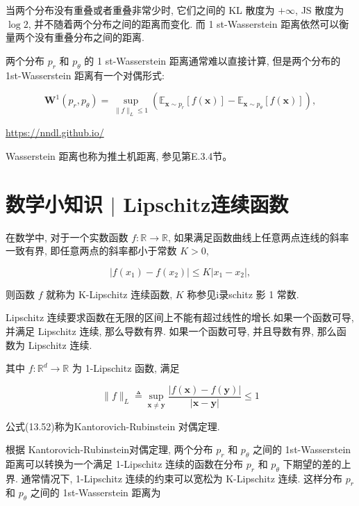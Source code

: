 \documentclass[10pt]{article}
\begin{document}
当两个分布没有重叠或者重叠非常少时, 它们之间的 KL 散度为 $+\infty$, JS 散度为 $\log 2$, 并不随着两个分布之间的距离而变化. 而 1 st-Wasserstein 距离依然可以衡量两个没有重叠分布之间的距离.

两个分布 $p_{r}$ 和 $p_{\theta}$ 的 1 st-Wasserstein 距离通常难以直接计算, 但是两个分布的 1st-Wasserstein 距离有一个对偶形式:


\begin{equation*}
\boldsymbol{W}^{1}\left(p_{r}, p_{\theta}\right)=\sup _{\|f\|_{L} \leq 1}\left(\mathbb{E}_{\boldsymbol{x} \sim p_{r}}[f(\boldsymbol{x})]-\mathbb{E}_{\boldsymbol{x} \sim p_{\theta}}[f(\boldsymbol{x})]\right), \tag{13.52}
\end{equation*}


\href{https://nndl.github.io/}{https://nndl.github.io/}

Wasserstein 距离也称为推土机距离, 参见第E.3.4节。

\section*{数学小知识 $\mid$ Lipschitz连续函数}
在数学中, 对于一个实数函数 $f: \mathbb{R} \rightarrow \mathbb{R}$, 如果满足函数曲线上任意两点连线的斜率一致有界, 即任意两点的斜率都小于常数 $K>0$,


\begin{equation*}
\left|f\left(x_{1}\right)-f\left(x_{2}\right)\right| \leq K\left|x_{1}-x_{2}\right|, \tag{13.51}
\end{equation*}


则函数 $f$ 就称为 $\mathrm{K}$-Lipschitz 连续函数, $K$ 称参见i录schitz 影 1 常数.

Lipschitz 连续要求函数在无限的区间上不能有超过线性的增长.如果一个函数可导, 并满足 Lipschitz 连续, 那么导数有界. 如果一个函数可导, 并且导数有界, 那么函数为 Lipschitz 连续.

其中 $f: \mathbb{R}^{d} \rightarrow \mathbb{R}$ 为 1-Lipschitz 函数, 满足


\begin{equation*}
\|f\|_{L} \triangleq \sup _{\boldsymbol{x} \neq \boldsymbol{y}} \frac{|f(\boldsymbol{x})-f(\boldsymbol{y})|}{|\boldsymbol{x}-\boldsymbol{y}|} \leq 1 \tag{13.53}
\end{equation*}


公式(13.52)称为Kantorovich-Rubinstein 对偶定理.

根据 Kantorovich-Rubinstein对偶定理, 两个分布 $p_{r}$ 和 $p_{\theta}$ 之间的 1st-Wasserstein 距离可以转换为一个满足 1-Lipschitz 连续的函数在分布 $p_{r}$ 和 $p_{\theta}$ 下期望的差的上界. 通常情况下, 1-Lipschitz 连续的约束可以宽松为 K-Lipschitz 连续. 这样分布 $p_{r}$ 和 $p_{\theta}$ 之间的 1st-Wasserstein 距离为
\end{document}
